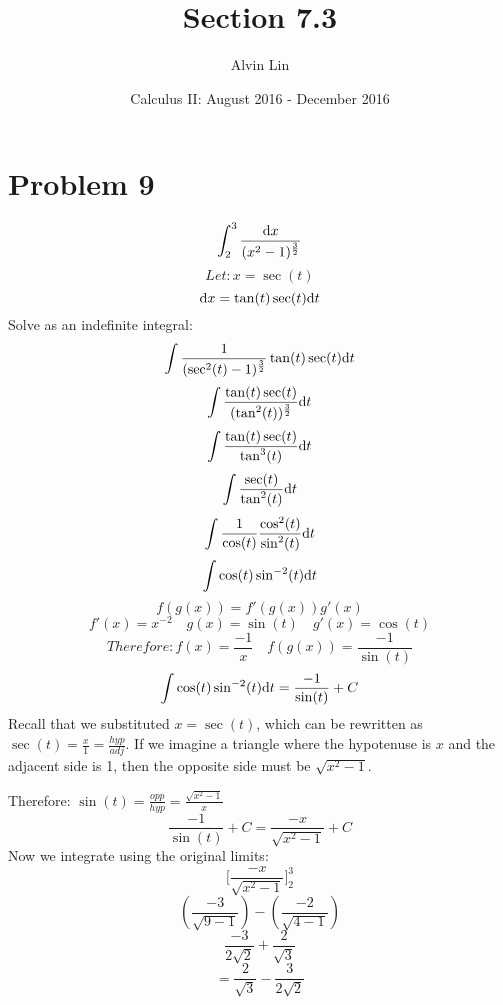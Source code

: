 \documentclass[letterpaper, 12pt]{math}
\title{Section 7.3}
\author{Alvin Lin}
\date{Calculus II: August 2016 - December 2016}
\begin{document}
\maketitle

\section*{Problem 9}
\[ \int_{2}^{3}{\frac{\mathrm{d}{x}}{(x^{2}-1)^{\frac{3}{2}}}} \]
\[ Let: x = \sec(t) \]
\[ \mathrm{d}{x} = \tan(t)\sec(t)\mathrm{d}{t} \]
Solve as an indefinite integral:
\[ \int{\frac{1}{(\sec^{2}(t)-1)^{\frac{3}{2}}}\tan(t)\sec(t)\mathrm{d}{t}} \]
\[ \int{\frac{\tan(t)\sec(t)}{(\tan^{2}(t))^{\frac{3}{2}}}\mathrm{d}{t}} \]
\[ \int{\frac{\tan(t)\sec(t)}{\tan^{3}(t)}\mathrm{d}{t}} \]
\[ \int{\frac{\sec(t)}{\tan^{2}(t)}\mathrm{d}{t}} \]
\[ \int{\frac{1}{\cos(t)}\frac{\cos^{2}(t)}{\sin^{2}(t)}\mathrm{d}{t}} \]
\[ \int{\cos(t)\sin^{-2}(t)\mathrm{d}{t}} \]
\[ f(g(x)) = f'(g(x))g'(x) \]
\[ f'(x) = x^{-2} \quad g(x) = \sin(t) \quad g'(x) = \cos(t) \]
\[ Therefore: f(x) = \frac{-1}{x} \quad f(g(x)) = \frac{-1}{\sin(t)} \]
\[ \int{\cos(t)\sin^{-2}(t)\mathrm{d}{t}} = \frac{-1}{\sin(t)}+C \]
Recall that we substituted \( x = \sec(t) \), which can be rewritten as
\( \sec(t) = \frac{x}{1} = \frac{hyp}{adj} \). If we imagine a triangle where
the hypotenuse is \( x \) and the adjacent side is 1, then the opposite side
must be \( \sqrt{x^{2}-1} \).
\begin{center}
\end{center}
Therefore: \( \sin(t) = \frac{opp}{hyp} = \frac{\sqrt{x^{2}-1}}{x} \)
\[ \frac{-1}{\sin(t)}+C = \frac{-x}{\sqrt{x^{2}-1}}+C \]
Now we integrate using the original limits:
\[ \bigg[\frac{-x}{\sqrt{x^{2}-1}}\bigg]_{2}^{3} \]
\[ (\frac{-3}{\sqrt{9-1}})-(\frac{-2}{\sqrt{4-1}}) \]
\[ \frac{-3}{2\sqrt{2}}+\frac{2}{\sqrt{3}} \]
\[ = \frac{2}{\sqrt{3}}-\frac{3}{2\sqrt{2}} \]
\end{document}
